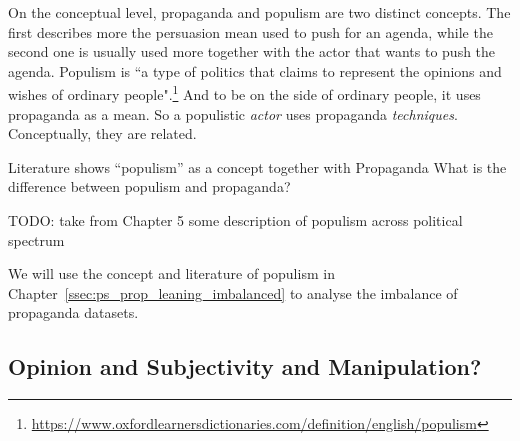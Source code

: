 
On the conceptual level, propaganda and populism are two distinct concepts. The first describes more the persuasion mean used to push for an agenda, while the second one is usually used more together with the actor that wants to push the agenda. Populism is ``a type of politics that claims to represent the opinions and wishes of ordinary people".\footnote{\url{https://www.oxfordlearnersdictionaries.com/definition/english/populism}}
And to be on the side of ordinary people, it uses propaganda as a mean. So a populistic \emph{actor} uses propaganda \emph{techniques}. Conceptually, they are related.


Literature shows “populism” as a concept together with Propaganda
What is the difference between populism and propaganda?


TODO: take from Chapter 5 some description of populism across political spectrum

We will use the concept and literature of \gls{populism} in Chapter~\ref{ssec:ps_prop_leaning_imbalanced} to analyse the imbalance of propaganda datasets.


\subsection{Opinion and Subjectivity and Manipulation?}


